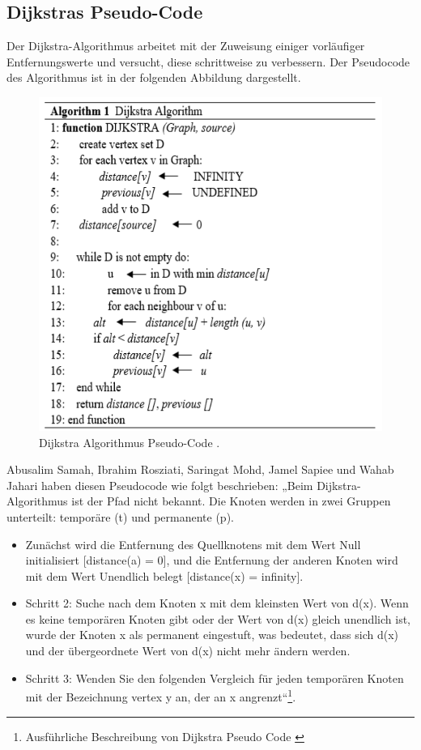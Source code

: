 \subsection{Dijkstras Pseudo-Code}

Der Dijkstra-Algorithmus arbeitet mit der Zuweisung einiger vorläufiger Entfernungswerte und versucht, diese schrittweise zu verbessern. Der Pseudocode des Algorithmus ist in der folgenden Abbildung dargestellt\cite{Research-id9}.
 \begin{figure}[H]
	\centering
	\includegraphics[width=1.0\textwidth]{images/Dijkstra_pseudoCode.PNG}
	\caption{\label{fig:Dijkstra}Dijkstra Algorithmus Pseudo-Code \cite{Research-id7}.}
\end{figure}

Abusalim Samah, Ibrahim Rosziati, Saringat Mohd, Jamel Sapiee und Wahab Jahari haben  diesen Pseudocode wie folgt beschrieben:
\newline
\newline
 „Beim Dijkstra-Algorithmus ist der Pfad nicht bekannt. Die Knoten werden in zwei Gruppen unterteilt: temporäre (t) und permanente (p).
\begin{itemize}
	\item  Zunächst wird die Entfernung des Quellknotens mit dem Wert Null initialisiert [distance(a) = 0], und die Entfernung der anderen Knoten wird mit dem Wert Unendlich belegt [distance(x) = infinity]. 
	\item Schritt 2: Suche nach dem Knoten x mit dem kleinsten Wert von d(x). Wenn es keine temporären Knoten gibt oder der Wert von d(x) gleich unendlich ist, wurde der Knoten x als permanent eingestuft, was bedeutet, dass sich d(x) und der übergeordnete Wert von d(x) nicht mehr ändern werden. 
	\item Schritt 3: Wenden Sie den folgenden Vergleich für jeden temporären Knoten mit der Bezeichnung vertex y an, der an x angrenzt“\footnote{Ausführliche Beschreibung von Dijkstra Pseudo Code \cite{Research-id7}}.
\end{itemize}



